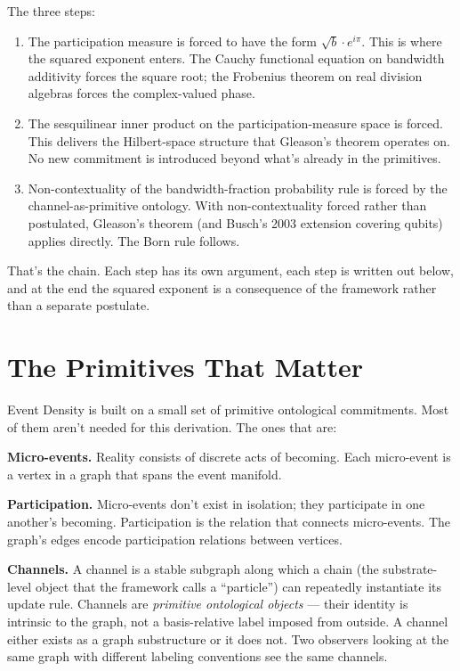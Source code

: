 \documentclass[11pt,a4paper]{article}
\begin{document}
The three steps:

\begin{enumerate}[noitemsep]
  \item The participation measure is forced to have the form $\sqrt{b}\cdot e^{i\pi}$. This is where the squared exponent enters. The Cauchy functional equation on bandwidth additivity forces the square root; the Frobenius theorem on real division algebras forces the complex-valued phase.
  \item The sesquilinear inner product on the participation-measure space is forced. This delivers the Hilbert-space structure that Gleason's theorem operates on. No new commitment is introduced beyond what's already in the primitives.
  \item Non-contextuality of the bandwidth-fraction probability rule is forced by the channel-as-primitive ontology. With non-contextuality forced rather than postulated, Gleason's theorem (and Busch's 2003 extension covering qubits) applies directly. The Born rule follows.
\end{enumerate}

That's the chain. Each step has its own argument, each step is written out below, and at the end the squared exponent is a consequence of the framework rather than a separate postulate.

\section{The Primitives That Matter}

Event Density is built on a small set of primitive ontological commitments. Most of them aren't needed for this derivation. The ones that are:

\textbf{Micro-events.} Reality consists of discrete acts of becoming. Each micro-event is a vertex in a graph that spans the event manifold.

\textbf{Participation.} Micro-events don't exist in isolation; they participate in one another's becoming. Participation is the relation that connects micro-events. The graph's edges encode participation relations between vertices.

\textbf{Channels.} A channel is a stable subgraph along which a chain (the substrate-level object that the framework calls a ``particle'') can repeatedly instantiate its update rule. Channels are \emph{primitive ontological objects} --- their identity is intrinsic to the graph, not a basis-relative label imposed from outside. A channel either exists as a graph substructure or it does not. Two observers looking at the same graph with different labeling conventions see the same channels.
\end{document}
